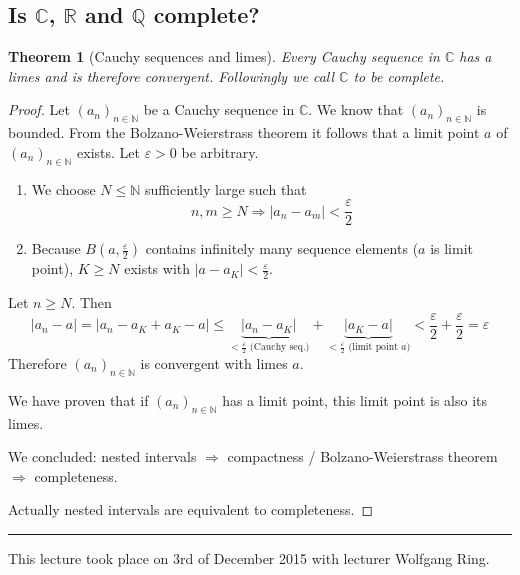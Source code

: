 \documentclass[a4paper,landscape,twocolumn]{article}
\newtheorem{theorem}{Theorem}
\newcommand\abs[1]{\left|#1\right|}
\newcommand\seq[1]{{\left(#1\right)}_{n \in \mathbb N}}
\newcommand\meta[3]{\hrule{} This #1 took place on #2 with lecturer #3.\par}
\begin{document}
\subsection{Is $\mathbb C$, $\mathbb R$ and $\mathbb Q$ complete?}
%
\begin{theorem}[Cauchy sequences and limes]
  Every Cauchy sequence in $\mathbb C$ has a limes and is therefore convergent.
  Followingly we call $\mathbb C$ to be \emph{complete}.
\end{theorem}
\begin{proof}
  Let $\seq{a_n}$ be a Cauchy sequence in $\mathbb C$.
  We know that $\seq{a_n}$ is bounded.
  From the Bolzano-Weierstrass theorem it follows that a limit point $a$
  of $\seq{a_n}$ exists. Let $\varepsilon > 0$ be arbitrary.
  \begin{enumerate}
    \item We choose $N \leq \mathbb N$ sufficiently large such that
      \[ n,m \geq N \Rightarrow \abs{a_n - a_m} < \frac\varepsilon2 \]
    \item Because $B(a, \frac\varepsilon2)$ contains infinitely many sequence elements ($a$ is limit point),
      $K \geq N$ exists with $\abs{a - a_K} < \frac{\varepsilon}{2}$.
  \end{enumerate}
  Let $n \geq N$. Then
  \[
      \abs{a_n - a}
      = \abs{a_n - a_K + a_K - a} \leq \underbrace{\abs{a_n - a_K}}_{< \frac\varepsilon2 \text{ (Cauchy seq.)}} + \underbrace{\abs{a_K - a}}_{< \frac\varepsilon2 \text{ (limit point $a$)}}
      < \frac\varepsilon2 + \frac\varepsilon2 = \varepsilon
  \]
  Therefore $\seq{a_n}$ is convergent with limes $a$.

  We have proven that if $\seq{a_n}$ has a limit point, this limit point is also its limes.

  We concluded: nested intervals $\Rightarrow$ compactness / Bolzano-Weierstrass theorem $\Rightarrow$ completeness.

  Actually nested intervals are equivalent to completeness.
\end{proof}

\meta{lecture}{3rd of December 2015}{Wolfgang Ring}
\end{document}
